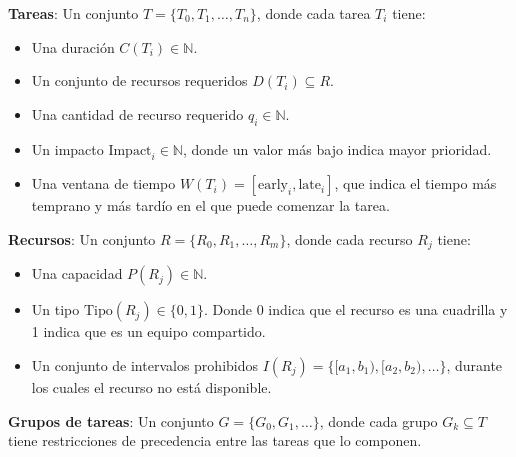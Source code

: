 \documentclass{article}
\begin{document}
\textbf{Tareas}: Un conjunto \( T = \{T_0, T_1, \dots, T_n\} \), donde cada tarea \( T_i \) tiene:
  \begin{itemize}
    \item Una duración \( C(T_i) \in \mathbb{N} \).
    \item Un conjunto de recursos requeridos \( D(T_i) \subseteq R \).
    \item Una cantidad de recurso requerido \( q_i \in \mathbb{N} \).
    \item Un impacto \( \text{Impact}_i \in \mathbb{N} \), donde un valor más bajo indica mayor prioridad.
    \item Una ventana de tiempo \( W(T_i) = [\text{early}_i, \text{late}_i] \), que indica el tiempo más temprano y más tardío en el que puede comenzar la tarea.
  \end{itemize}

\textbf{Recursos}: Un conjunto \( R = \{R_0, R_1, \dots, R_m\} \), donde cada recurso \( R_j \) tiene:
  \begin{itemize}
    \item Una capacidad \( P(R_j) \in \mathbb{N} \).
    \item Un tipo \( \text{Tipo}(R_j) \in \{0, 1\} \). Donde 0 indica que el recurso es una cuadrilla y 1 indica que es un equipo compartido. 
    \item Un conjunto de intervalos prohibidos \( I(R_j) = \{[a_1, b_1), [a_2, b_2), \dots\} \), durante los cuales el recurso no está disponible.
  \end{itemize}

\textbf{Grupos de tareas}: Un conjunto \( G = \{G_0, G_1, \dots\} \), donde cada grupo \( G_k \subseteq T \) tiene restricciones de precedencia entre las tareas que lo componen.

\vspace{0.5cm}
\end{document}
